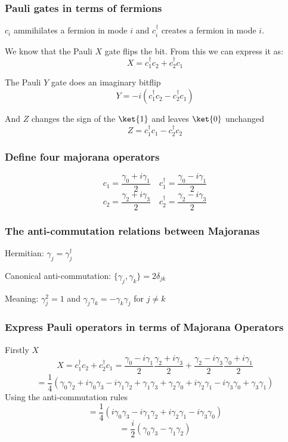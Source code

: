 \documentclass[11pt,landscape]{article}
\begin{document}
    \subsubsection{Pauli gates in terms of
fermions}\label{pauli-gates-in-terms-of-fermions}

\(c_i\) ammihilates a fermion in mode \(i\) and \(c_i^{†}\) creates a
fermion in mode \(i\).

We know that the Pauli \(X\) gate flips the bit. From this we can
express it as: \[X = c_1^{†} c_2 + c_2^{†} c_1 \]

The Pauli \(Y\) gate does an imaginary bitflip
\[ Y = -i(c_1^{†} c_2 - c_2^{†} c_1)\]

And \(Z\) changes the sign of the \(\ket{1}\) and leaves \(\ket{0}\)
unchanged \[Z = c_1^{†}c_1 - c_2^{†} c_2\]

\subsubsection{Define four majorana
operators}\label{define-four-majorana-operators}

\[c_1= \frac{γ_0 + iγ_1}{2} \quad c_1^{†}= \frac{γ_0 - iγ_1}{2} \]
\[c_2= \frac{γ_2 + iγ_3}{2} \quad c_2^{†}= \frac{γ_2 - iγ_3}{2} \]

\subsubsection{The anti-commutation relations between
Majoranas}\label{the-anti-commutation-relations-between-majoranas}

Hermitian: \(γ_j = γ_j^{†}\)

Canonical anti-commutation: \(\{γ_j,γ_k\}=2δ_{jk}\)

Meaning: \(γ_j^{2}=1\) and \(γ_j γ_k = -γ_k γ_j\) for \(j≠ k\)

    \subsubsection{Express Pauli operators in terms of Majorana
Operators}\label{express-pauli-operators-in-terms-of-majorana-operators}

Firstly \(X\) \[
X = c_1^{†} c_2 + c_2^{†} c_1 = \frac{γ_0 - iγ_1}{2} \frac{γ_2 + iγ_3}{2}  +  \frac{γ_2 - iγ_3}{2}\frac{γ_0 + iγ_1}{2}
\] \[
=\frac{1}{4} (γ_0γ_2 + iγ_0γ_3 - iγ_1γ_2 + γ_1γ_3 + γ_2γ_0 + iγ_2γ_1 -iγ_3γ_0 + γ_3γ_1)
\] Using the anti-commutation rules \[
=\frac{1}{4} ( iγ_0γ_3 - iγ_1γ_2  + iγ_2γ_1 -iγ_3γ_0 )
\] \[
=\frac{i}{2} ( γ_0γ_3 - γ_1γ_2 )
\]
\end{document}
